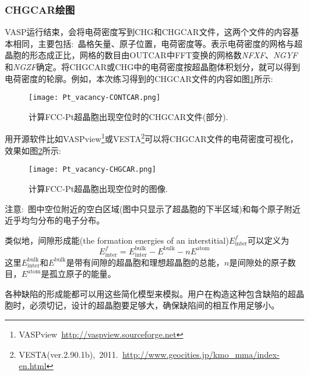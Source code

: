 \subsubsection{\rm{CHGCAR}绘图}
\textrm{VASP}运行结束，会将电荷密度写到\textrm{CHG}和\textrm{CHGCAR}文件，这两个文件的内容基本相同，主要包括:~晶格矢量、原子位置，电荷密度等。表示电荷密度的网格与超晶胞的形态成正比，网格的数目由\textrm{OUTCAR}中\textrm{FFT}变换的网格数\textit{NFXF}、\textit{NGYF}和\textit{NGZF}确定。将\textrm{CHGCAR}或\textrm{CHG}中的电荷密度按超晶胞体积划分，就可以得到电荷密度的轮廓。例如，本次练习得到的\textrm{CHGCAR}文件的内容如图\ref{Pt_vacancy-CHGCAR}所示:~
\begin{figure}[h!]
\centering
\vskip -5pt
\texttt{[image: Pt\_vacancy-CONTCAR.png]}
\caption{\small \textrm{计算\textrm{FCC-Pt}超晶胞出现空位时的\textrm{CHGCAR}文件(部分).}}%
\label{Pt_vacancy-CHGCAR}
\end{figure}

用开源软件比如\textrm{VASPview}\footnote{\textrm{VASPview~\url{http://vaspview.sourceforge.net}}}或\textrm{VESTA}\footnote{\textrm{VESTA(ver.2.90.1b),~2011.~\url{http://www.geocities.jp/kmo\_mma/index-en.html}}}可以将\textrm{CHGCAR}文件的电荷密度可视化，效果如图\ref{Pt_vacancy-Density}所示:
\begin{figure}[h!]
\centering
\texttt{[image: Pt\_vacancy-CHGCAR.png]}
\caption{\small \textrm{计算\textrm{FCC-Pt}超晶胞出现空位时的图像.}}%
\label{Pt_vacancy-Density}
\end{figure}

注意:~图中空位附近的空白区域(图中只显示了超晶胞的下半区域)和每个原子附近近乎均匀分布的电子分布。

类似地，间隙形成能\textrm{(the formation energies of an interstitial)}$E_{\mathrm{inter}}^f$可以定义为
\begin{displaymath}
	E_{\mathrm{inter}}^f=E_{\mathrm{inter}}^{\mathrm{bulk}}-E^{\mathrm{bulk}}-nE^{\mathrm{atom}}
\end{displaymath}
这里$E_{\mathrm{inter}}^{\mathrm{bulk}}$和$E^{\mathrm{bulk}}$是带有间隙的超晶胞和理想超晶胞的总能，$n$是间隙处的原子数目，$E^{\mathrm{atom}}$是孤立原子的能量。

各种缺陷的形成能都可以用这些简化模型来模拟。用户在构造这种包含缺陷的超晶胞时，必须切记，设计的超晶胞要足够大，确保缺陷间的相互作用足够小。


